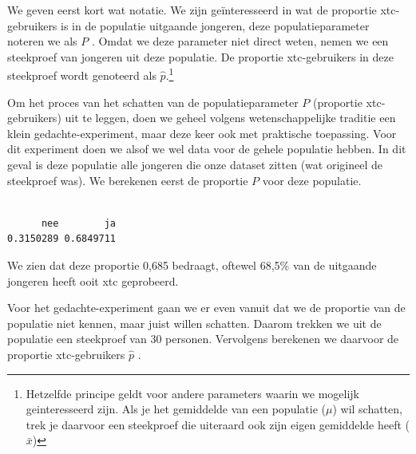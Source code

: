 \documentclass[
  letterpaper,
  DIV=11,
  numbers=noendperiod]{scrreprt}
\newenvironment{Shaded}{\begin{snugshade}}{\end{snugshade}}
\newcommand{\AttributeTok}[1]{\textcolor[rgb]{0.40,0.45,0.13}{#1}}
\newcommand{\CommentTok}[1]{\textcolor[rgb]{0.37,0.37,0.37}{#1}}
\newcommand{\DecValTok}[1]{\textcolor[rgb]{0.68,0.00,0.00}{#1}}
\newcommand{\FunctionTok}[1]{\textcolor[rgb]{0.28,0.35,0.67}{#1}}
\newcommand{\NormalTok}[1]{\textcolor[rgb]{0.00,0.23,0.31}{#1}}
\newcommand{\OtherTok}[1]{\textcolor[rgb]{0.00,0.23,0.31}{#1}}
\newcommand{\SpecialCharTok}[1]{\textcolor[rgb]{0.37,0.37,0.37}{#1}}
\begin{document}
We geven eerst kort wat notatie. We zijn geïnteresseerd in wat de
proportie xtc-gebruikers is in de populatie uitgaande jongeren, deze
populatieparameter noteren we als \(P\) . Omdat we deze parameter niet
direct weten, nemen we een steekproef van jongeren uit deze populatie.
De proportie xtc-gebruikers in deze steekproef wordt genoteerd als
\(\hat{p}\).\footnote{Hetzelfde principe geldt voor andere parameters
  waarin we mogelijk geinteresseerd zijn. Als je het gemiddelde van een
  populatie (\(\mu\)) wil schatten, trek je daarvoor een steekproef die
  uiteraard ook zijn eigen gemiddelde heeft (\(\bar{x}\))}

Om het proces van het schatten van de populatieparameter \(P\)
(proportie xtc-gebruikers) uit te leggen, doen we geheel volgens
wetenschappelijke traditie een klein gedachte-experiment, maar deze keer
ook met praktische toepassing. Voor dit experiment doen we alsof we wel
data voor de gehele populatie hebben. In dit geval is deze populatie
alle jongeren die onze dataset zitten (wat origineel de steekproef was).
We berekenen eerst de proportie \(P\) voor deze populatie.

\begin{Shaded}
\end{Shaded}

\begin{verbatim}

      nee        ja 
0.3150289 0.6849711 
\end{verbatim}

We zien dat deze proportie 0,685 bedraagt, oftewel 68,5\% van de
uitgaande jongeren heeft ooit xtc geprobeerd.

Voor het gedachte-experiment gaan we er even vanuit dat we de proportie
van de populatie niet kennen, maar juist willen schatten. Daarom trekken
we uit de populatie een steekproef van 30 personen. Vervolgens berekenen
we daarvoor de proportie xtc-gebruikers \(\hat{p}\) .

\begin{Shaded}
\end{Shaded}
\end{document}
